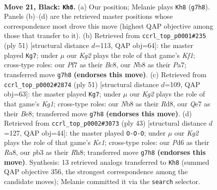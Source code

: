 \documentclass[11pt]{article}
\begin{document}
\clearpage

\begin{figure}[p]\centering
\begin{subfigure}{0.46\textwidth}\centering
\resizebox{\linewidth}{!}{%
\newchessgame
\chessboard[
  setfen={rn2r3/p2nqpkP/3p1b2/R1pP2p1/4P1P1/1PNQ4/4N3/2B1K2R b K - 0 21},
  showmover=false,
  pgfstyle=straightmove, color=movearrow, markmove={g7-h8}
]}
\caption{}
\end{subfigure}\hfill
\begin{subfigure}{0.46\textwidth}\centering
\resizebox{\linewidth}{!}{%
\newchessgame
\chessboard[
  setfen={1rb2k2/p2nbp2/2p2q1r/P2p4/3P3p/1N1BP3/2Q1NPP1/1R3K1R b - - 4 26},
  showmover=false,
  pgfstyle=straightmove, color=movearrow, markmove={f8-g7}
]}
\caption{}
\end{subfigure}
\\[4pt]
\begin{subfigure}{0.46\textwidth}\centering
\resizebox{\linewidth}{!}{%
\newchessgame
\chessboard[
  setfen={3rb1k1/5p1p/p1nq1np1/8/2pPP3/P1N4P/2BQN1P1/5RK1 b - - 2 26},
  showmover=false,
  pgfstyle=straightmove, color=movearrow, markmove={g8-g7}
]}
\caption{}
\end{subfigure}\hfill
\begin{subfigure}{0.46\textwidth}\centering
\resizebox{\linewidth}{!}{%
\newchessgame
\chessboard[
  setfen={r3kb1r/pp1n4/1qn1p1p1/3p4/3P2Np/5N2/PP3PK1/R1BQR3 b kq - 1 22},
  showmover=false,
  pgfstyle=straightmove, color=movearrow, markmove={e8-c8}
]}
\caption{}
\end{subfigure}
\caption{\textbf{Move 21, Black: \texttt{Kh8}.} (a) Our position; Melanie plays \texttt{Kh8} (\texttt{g7h8}). Panels (b)--(d) are the retrieved master positions whose correspondence most drove this move (highest QAP objective among those that transfer to it). (b) Retrieved from \texttt{ccrl\_top\_p0001\#235} (ply 51) [structural distance $d$=113, QAP obj=64]: the master played \texttt{Kg7}; under $\mu$ our \emph{Kg2} plays the role of that game's \emph{Kf1}; cross-type roles: our \emph{P}f7 as their \emph{B}c8, our \emph{N}b8 as their \emph{P}a7; transferred move \texttt{g7h8} \textbf{(endorses this move)}. (c) Retrieved from \texttt{ccrl\_top\_p0002\#2874} (ply 51) [structural distance $d$=109, QAP obj=63]: the master played \texttt{Kg7}; under $\mu$ our \emph{Kg2} plays the role of that game's \emph{Kg1}; cross-type roles: our \emph{N}b8 as their \emph{R}d8, our \emph{Q}e7 as their \emph{B}e8; transferred move \texttt{g7h8} \textbf{(endorses this move)}. (d) Retrieved from \texttt{ccrl\_top\_p0002\#3073} (ply 43) [structural distance $d$=127, QAP obj=44]: the master played \texttt{O-O-O}; under $\mu$ our \emph{Kg2} plays the role of that game's \emph{Ke1}; cross-type roles: our \emph{P}d6 as their \emph{R}a8, our \emph{p}b3 as their \emph{R}h8; transferred move \texttt{g7h8} \textbf{(endorses this move)}. Synthesis: 13 retrieved analogs transferred to \texttt{Kh8} (summed QAP objective 356, the strongest correspondence among the candidate moves); Melanie committed it via the \texttt{search} selector.}
\label{fig:thought-m41}
\end{figure}
\end{document}
